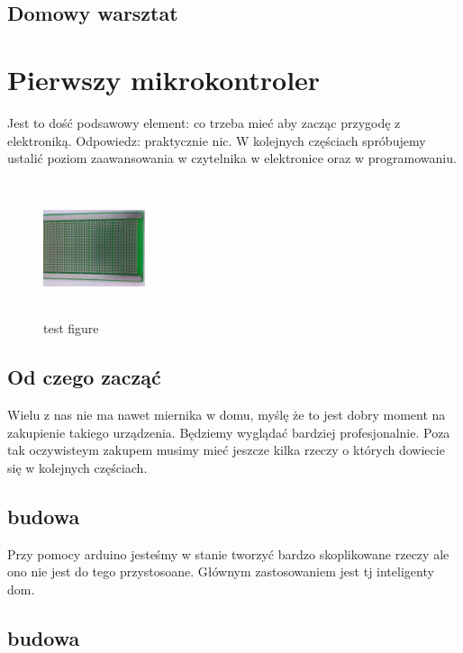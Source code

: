	\subsection {Domowy warsztat}
    
%        
        
\newpage
\section{Pierwszy mikrokontroler}
		Jest to dość podsawowy element: co trzeba mieć aby zacząc przygodę z elektroniką. Odpowiedz: praktycznie nic. W kolejnych częściach spróbujemy ustalić poziom zaawansowania w czytelnika w elektronice oraz w programowaniu.
\begin{figure}%
  \centering
  \includegraphics[bb=0 0 1000 1000, width=3cm, height=4cm]{universe.jpg}
  \caption{test figure}
  \label{fig:test}
\end{figure}

		\subsection {Od czego zacząć}
			Wielu z nas nie ma nawet miernika w domu, myślę że to jest dobry moment na zakupienie takiego urządzenia. Będziemy wyglądać bardziej profesjonalnie. Poza tak oczywisteym zakupem musimy mieć jeszcze kilka rzeczy o których dowiecie się w kolejnych częściach.
	\subsection{budowa}
	Przy pomocy arduino jesteśmy w stanie tworzyć bardzo skoplikowane rzeczy ale ono nie jest do tego przystosoane. Głównym zastosowaniem jest tj inteligenty dom.
	\subsection{budowa}
